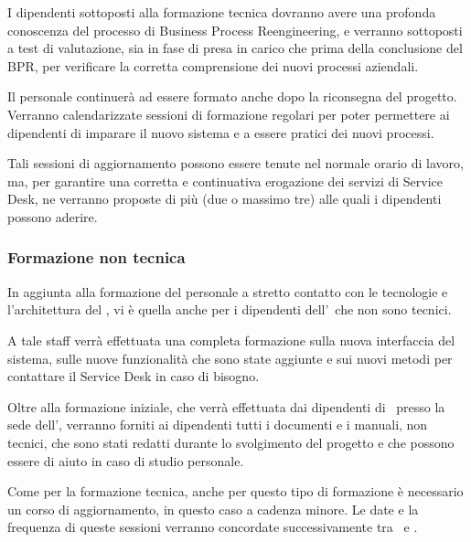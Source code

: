 			I dipendenti sottoposti alla formazione tecnica dovranno avere una profonda conoscenza del processo di Business Process Reengineering, e verranno sottoposti a test di valutazione, sia in fase di presa in carico che prima della conclusione del BPR, per verificare la corretta comprensione dei nuovi processi aziendali.
			
			Il personale continuerà ad essere formato anche dopo la riconsegna del progetto.
			Verranno calendarizzate sessioni di formazione regolari per poter permettere ai dipendenti di imparare il nuovo sistema e a essere pratici dei nuovi processi.
			
			Tali sessioni di aggiornamento possono essere tenute nel normale orario di lavoro, ma, per garantire una corretta e continuativa erogazione dei servizi di Service Desk, ne verranno proposte di più (due o massimo tre) alle quali i dipendenti possono aderire.
			
		\subsubsection{Formazione non tecnica}
			
			In aggiunta alla formazione del personale a stretto contatto con le tecnologie e l'architettura del \helpdesk, vi è quella anche per i dipendenti dell'\istituto~che non sono tecnici.
			
			A tale staff verrà effettuata una completa formazione sulla nuova interfaccia del sistema, sulle nuove funzionalità che sono state aggiunte e sui nuovi metodi per contattare il Service Desk in caso di bisogno.
			
			Oltre alla formazione iniziale, che verrà effettuata dai dipendenti di \azienda~presso la sede dell'\istituto, verranno forniti ai dipendenti tutti i documenti e i manuali, non tecnici, che sono stati redatti durante lo svolgimento del progetto e che possono essere di aiuto in caso di studio personale.
			
			Come per la formazione tecnica, anche per questo tipo di formazione è necessario un corso di aggiornamento, in questo caso a cadenza minore.
			Le date e la frequenza di queste sessioni verranno concordate successivamente tra \azienda~e \istituto.
		